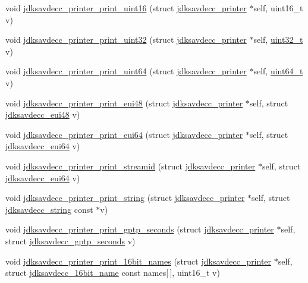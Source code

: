 \begin{DoxyCompactItemize}
\item 
void \hyperlink{group__util_ga9793e0ff8e7ed25d957282ee6b257ce2}{jdksavdecc\+\_\+printer\+\_\+print\+\_\+uint16} (struct \hyperlink{structjdksavdecc__printer}{jdksavdecc\+\_\+printer} $\ast$self, uint16\+\_\+t v)
\item 
void \hyperlink{group__util_ga5ab4b0ba019ff6f6aa9d95d77560b294}{jdksavdecc\+\_\+printer\+\_\+print\+\_\+uint32} (struct \hyperlink{structjdksavdecc__printer}{jdksavdecc\+\_\+printer} $\ast$self, \hyperlink{parse_8c_a6eb1e68cc391dd753bc8ce896dbb8315}{uint32\+\_\+t} v)
\item 
void \hyperlink{group__util_ga58db4ed1324866d6b90ba8d0cc854251}{jdksavdecc\+\_\+printer\+\_\+print\+\_\+uint64} (struct \hyperlink{structjdksavdecc__printer}{jdksavdecc\+\_\+printer} $\ast$self, \hyperlink{parse_8c_aec6fcb673ff035718c238c8c9d544c47}{uint64\+\_\+t} v)
\item 
void \hyperlink{group__util_gacb8108c4a12e752331804ec34d89f9ab}{jdksavdecc\+\_\+printer\+\_\+print\+\_\+eui48} (struct \hyperlink{structjdksavdecc__printer}{jdksavdecc\+\_\+printer} $\ast$self, struct \hyperlink{structjdksavdecc__eui48}{jdksavdecc\+\_\+eui48} v)
\item 
void \hyperlink{group__util_gafdf65e002e889f4fc89db5d1e532eaa3}{jdksavdecc\+\_\+printer\+\_\+print\+\_\+eui64} (struct \hyperlink{structjdksavdecc__printer}{jdksavdecc\+\_\+printer} $\ast$self, struct \hyperlink{structjdksavdecc__eui64}{jdksavdecc\+\_\+eui64} v)
\item 
void \hyperlink{group__util_ga8439b1cdb450c02010bc8318643f67a2}{jdksavdecc\+\_\+printer\+\_\+print\+\_\+streamid} (struct \hyperlink{structjdksavdecc__printer}{jdksavdecc\+\_\+printer} $\ast$self, struct \hyperlink{structjdksavdecc__eui64}{jdksavdecc\+\_\+eui64} v)
\item 
void \hyperlink{group__util_ga9ac55391c4d46889d21236f9255a79e7}{jdksavdecc\+\_\+printer\+\_\+print\+\_\+string} (struct \hyperlink{structjdksavdecc__printer}{jdksavdecc\+\_\+printer} $\ast$self, struct \hyperlink{structjdksavdecc__string}{jdksavdecc\+\_\+string} const $\ast$v)
\item 
void \hyperlink{group__util_ga23bde07a4c375ac4c987da505bc7053f}{jdksavdecc\+\_\+printer\+\_\+print\+\_\+gptp\+\_\+seconds} (struct \hyperlink{structjdksavdecc__printer}{jdksavdecc\+\_\+printer} $\ast$self, struct \hyperlink{structjdksavdecc__gptp__seconds}{jdksavdecc\+\_\+gptp\+\_\+seconds} v)
\item 
void \hyperlink{group__util_gab2b52d5747dd94956e7c008203606eae}{jdksavdecc\+\_\+printer\+\_\+print\+\_\+16bit\+\_\+names} (struct \hyperlink{structjdksavdecc__printer}{jdksavdecc\+\_\+printer} $\ast$self, struct \hyperlink{structjdksavdecc__16bit__name}{jdksavdecc\+\_\+16bit\+\_\+name} const names\mbox{[}$\,$\mbox{]}, uint16\+\_\+t v)

\end{DoxyCompactItemize}
